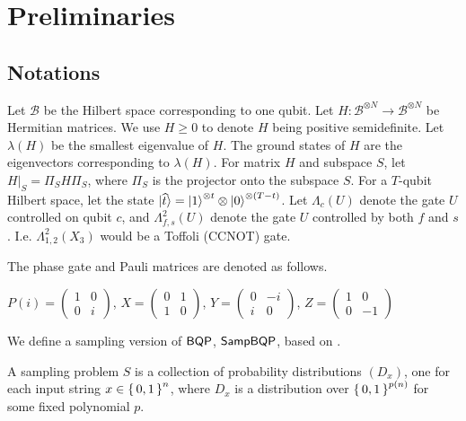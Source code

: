 \section{Preliminaries}

\subsection{Notations}

Let $\mathcal{B}$ be the Hilbert space corresponding to one qubit. Let $H:\mathcal{B}^{\otimes N}\rightarrow\mathcal{B}^{\otimes N}$ be Hermitian matrices. We use $H\geq0$ to denote $H$ being positive semidefinite. Let $\lambda(H)$ be the smallest eigenvalue of $H$. The ground states of $H$ are the eigenvectors corresponding to $\lambda(H)$. For matrix $H$ and subspace $S$, let $H\big|_S=\Pi_S H \Pi_S$, where $\Pi_S$ is the projector onto the subspace $S$. For a $T$-qubit Hilbert space, let the state $\ket{\widehat{t}}=\ket{1}^{\otimes t}\otimes \ket{0}^{{\otimes (T-t)}}$. Let $\Lambda_c(U)$ denote the gate $U$ controlled on qubit $c$, and $\Lambda^2_{f, s}(U)$ denote the gate $U$ controlled by both $f$ and $s$. I.e. $\Lambda^2_{1, 2}(X_3)$ would be a Toffoli (CCNOT) gate. 

The phase gate and Pauli matrices are denoted as follows.

\begin{definition}
	$P(i)=\begin{pmatrix}1&0\\0&i\end{pmatrix}$, $X=\begin{pmatrix}0&1\\1&0\end{pmatrix}$,
	$Y=\begin{pmatrix}0&-i\\i&0\end{pmatrix}$,
	$Z=\begin{pmatrix}1&0\\0&-1\end{pmatrix}$
\end{definition}

We define a sampling version of $\operatorname{\mathsf{BQP}}$, $\operatorname{\mathsf{SampBQP}}$, based on \cite{aaronson_2013}.

\begin{definition} 
	A sampling problem $S$ is a collection of probability distributions $(D_x)$, one for each input string $x\in\set{0,1}^n$, where $D_x$ is a distribution over $\set{0,1}^{p(n)}$ for some fixed polynomial $p$.
\end{definition}
    
